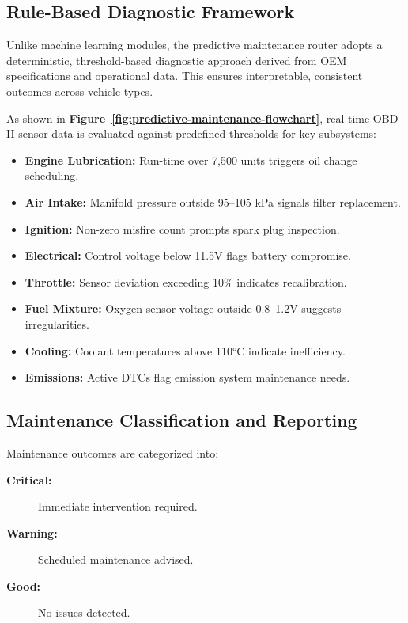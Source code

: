 \begin{enumerate}
        \subsection{Rule-Based Diagnostic Framework}

Unlike machine learning modules, the predictive maintenance router adopts a deterministic, threshold-based diagnostic approach derived from OEM specifications and operational data. This ensures interpretable, consistent outcomes across vehicle types.

As shown in \textbf{Figure~\ref{fig:predictive-maintenance-flowchart}}, real-time OBD-II sensor data is evaluated against predefined thresholds for key subsystems:

\begin{itemize}
    \item \textbf{Engine Lubrication:} Run-time over 7,500 units triggers oil change scheduling.
    \item \textbf{Air Intake:} Manifold pressure outside 95–105 kPa signals filter replacement.
    \item \textbf{Ignition:} Non-zero misfire count prompts spark plug inspection.
    \item \textbf{Electrical:} Control voltage below 11.5V flags battery compromise.
    \item \textbf{Throttle:} Sensor deviation exceeding 10\% indicates recalibration.
    \item \textbf{Fuel Mixture:} Oxygen sensor voltage outside 0.8–1.2V suggests irregularities.
    \item \textbf{Cooling:} Coolant temperatures above 110°C indicate inefficiency.
    \item \textbf{Emissions:} Active DTCs flag emission system maintenance needs.
\end{itemize}

\subsection{Maintenance Classification and Reporting}

Maintenance outcomes are categorized into:

\begin{description}
    \item[\textbf{Critical:}] Immediate intervention required.
    \item[\textbf{Warning:}] Scheduled maintenance advised.
    \item[\textbf{Good:}] No issues detected.
\end{description}


\end{enumerate}
